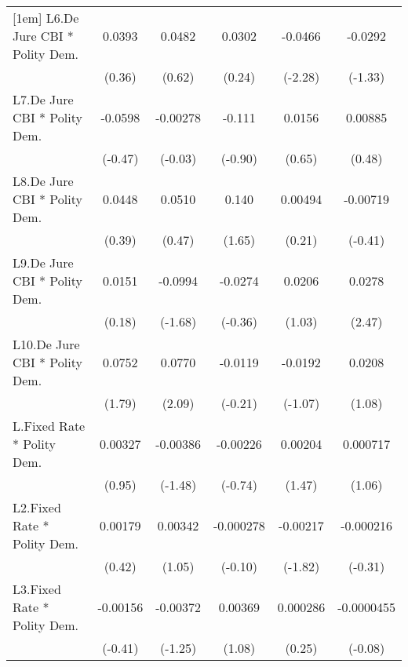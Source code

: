 {\begin{longtable}{l*{5}{c}}
[1em]
L6.De Jure CBI * Polity Dem.&   0.0393         &   0.0482         &   0.0302         &  -0.0466\sym{*}  &  -0.0292         \\
                &   (0.36)         &   (0.62)         &   (0.24)         &  (-2.28)         &  (-1.33)         \\
[1em]
L7.De Jure CBI * Polity Dem.&  -0.0598         & -0.00278         &   -0.111         &   0.0156         &  0.00885         \\
                &  (-0.47)         &  (-0.03)         &  (-0.90)         &   (0.65)         &   (0.48)         \\
[1em]
L8.De Jure CBI * Polity Dem.&   0.0448         &   0.0510         &    0.140         &  0.00494         & -0.00719         \\
                &   (0.39)         &   (0.47)         &   (1.65)         &   (0.21)         &  (-0.41)         \\
[1em]
L9.De Jure CBI * Polity Dem.&   0.0151         &  -0.0994         &  -0.0274         &   0.0206         &   0.0278\sym{*}  \\
                &   (0.18)         &  (-1.68)         &  (-0.36)         &   (1.03)         &   (2.47)         \\
[1em]
L10.De Jure CBI * Polity Dem.&   0.0752         &   0.0770\sym{*}  &  -0.0119         &  -0.0192         &   0.0208         \\
                &   (1.79)         &   (2.09)         &  (-0.21)         &  (-1.07)         &   (1.08)         \\
[1em]
L.Fixed Rate * Polity Dem.&  0.00327         & -0.00386         & -0.00226         &  0.00204         & 0.000717         \\
                &   (0.95)         &  (-1.48)         &  (-0.74)         &   (1.47)         &   (1.06)         \\
[1em]
L2.Fixed Rate * Polity Dem.&  0.00179         &  0.00342         &-0.000278         & -0.00217         &-0.000216         \\
                &   (0.42)         &   (1.05)         &  (-0.10)         &  (-1.82)         &  (-0.31)         \\
[1em]
L3.Fixed Rate * Polity Dem.& -0.00156         & -0.00372         &  0.00369         & 0.000286         &-0.0000455         \\
                &  (-0.41)         &  (-1.25)         &   (1.08)         &   (0.25)         &  (-0.08)         \\

\end{longtable}}
